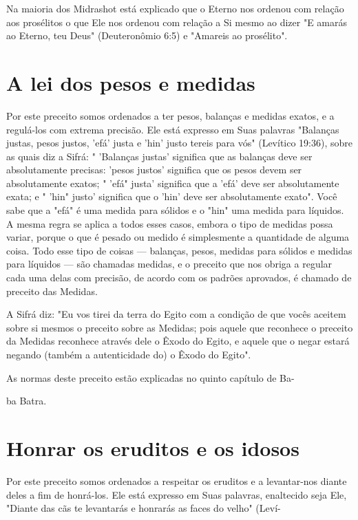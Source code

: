 \begin{itemize}
\begin{enumrate}
\begin{itemize}
\begin{itemize}
\begin{itemize}
Na maioria dos Midrashot está explicado que o Eterno nos ordenou com
relação aos prosélitos o que Ele nos ordenou com relação a Si mesmo ao
dizer "E amarás ao Eterno, teu Deus" (Deuteronômio 6:5) e "Amareis ao
prosélito".

\section{A lei dos pesos e medidas}

Por este preceito somos ordenados a ter pesos, balanças e medidas
exatos, e a regulá-los com extrema precisão. Ele está expresso em Suas
palavras "Balanças justas, pesos justos, 'efá' justa e 'hin' justo
tereis para vós" (Levítico 19:36), sobre as quais diz a Sifrá: "
'Balanças justas' significa que as balanças deve ser absolutamente
precisas: 'pesos justos' significa que os pesos devem ser absolutamente
exatos; " 'efá" justa' significa que a 'efá' deve ser absoluta­mente
exata; e " 'hin" justo' significa que o 'hin' deve ser absolutamente
exa­to". Você sabe que a "efá" é uma medida para sólidos e o "hin" uma
medida para líquidos. A mesma regra se aplica a todos esses casos,
embora o tipo de medidas possa variar, porque o que é pesado ou medido é
simplesmente a quan­tidade de alguma coisa. Todo esse tipo de coisas ---
balanças, pesos, medidas para sólidos e medidas para líquidos --- são
chamadas medidas, e o preceito que nos obriga a regular cada uma delas
com precisão, de acordo com os pa­drões aprovados, é chamado de preceito
das Medidas.

A Sifrá diz: "Eu vos tirei da terra do Egito com a condição de que vocês
aceitem sobre si mesmos o preceito sobre as Medidas; pois aquele que
reconhece o preceito da Medidas reconhece através dele o Êxodo do Egito,
e aquele que o negar estará negando (também a autenticidade do) o Êxodo
do Egito".


As normas deste preceito estão explicadas no quinto capítulo de Ba-


ba Batra.

\section{Honrar os eruditos e os idosos}

Por este preceito somos ordenados a respeitar os eruditos e a
levantar-nos diante deles a fim de honrá-los. Ele está expresso em Suas
palavras, enalte­cido seja Ele, "Diante das cãs te levantarás e honrarás
as faces do velho" (Leví-



\end{itemize}
\end{itemize}
\end{itemize}
\end{enumrate}
\end{itemize}
